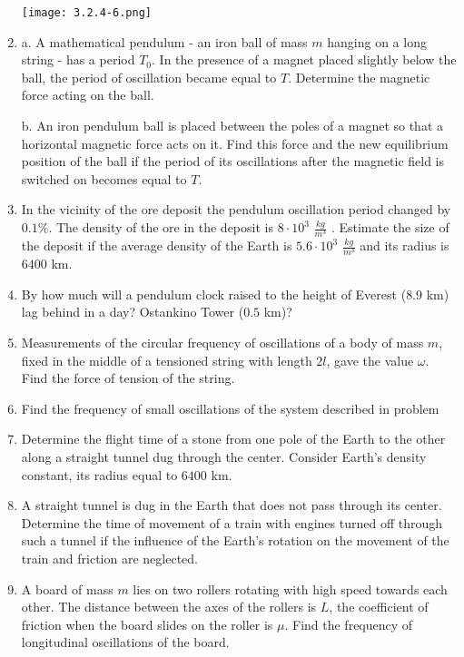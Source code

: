 \documentclass{article}
\begin{document}
\begin{enumerate}[label=3.2.\arabic*]
\begin{center}
    \texttt{[image: 3.2.4-6.png]}
\end{center}

\item a. A mathematical pendulum - an iron ball of mass $m$ hanging on a long string - has a period $T_0$. In the presence of a magnet placed slightly below the ball, the period of oscillation became equal to $T$. Determine the magnetic force acting on the ball. 

b. An iron pendulum ball is placed between the poles of a magnet so that a horizontal magnetic force acts on it. Find this force and the new equilibrium position of the ball if the period of its oscillations after the magnetic field is switched on becomes equal to $T$.

\item In the vicinity of the ore deposit the pendulum oscillation period changed by $0.1 \%$. The density of the ore in the deposit is $8 \cdot 10^3$ $\frac{kg}{m^3}$ . Estimate the size of the deposit if the average density of the Earth is $5.6 \cdot 10^3$ $\frac{kg}{m^3}$ and its radius is $6400$ km.

\item By how much will a pendulum clock raised to the height of Everest ($8.9$ km) lag behind in a day? Ostankino Tower ($0.5$ km)?

\item Measurements of the circular frequency of oscillations of a body of mass $m$, fixed in the middle of a tensioned string with length $2 l$, gave the value $\omega$. Find the force of tension of the string. 

\item Find the frequency of small oscillations of the system described in problem

\item Determine the flight time of a stone from one pole of the Earth to the other along a straight tunnel dug through the center. Consider Earth's density constant, its radius equal to $6400$ km.

\item A straight tunnel is dug in the Earth that does not pass through its center. Determine the time of movement of a train with engines turned off through such a tunnel if the influence of the Earth's rotation on the movement of the train and friction are neglected.

\item A board of mass $m$ lies on two rollers rotating with high speed towards each other. The distance between the axes of the rollers is $L$, the coefficient of friction when the board slides on the roller is $\mu$. Find the frequency of longitudinal oscillations of the board.


\end{enumerate}
\end{document}
